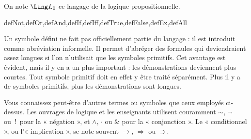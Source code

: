 \documentclass[11pt,a4paper,openany]{memoir}
\begin{document}
On note $\Lang L_0$ ce langage de la logique propositionnelle.


\begin{tagblock}{defNot,defOr,defAnd,defIf,defIff,defTrue,defFalse,defEx,defAll}
\begin{explain}
Un symbole défini ne fait pas officiellement partie du langage :
il est introduit comme abréviation informelle. Il permet d'abréger
des formules qui deviendraient assez longues si l'on n'utilisait que
les symboles primitifs. Cet avantage est évident, mais il y en a un
plus important : les démonstrations deviennent plus courtes. Tout
symbole primitif doit en effet y être traité séparément. Plus il y a
de symboles primitifs, plus les démonstrations sont longues.
\end{explain}
\end{tagblock}


\begin{intro}
Vous connaissez peut-être d'autres termes ou symboles que ceux
employés ci-dessus. Les ouvrages de logique et les enseignants
utilisent couramment $\sim$, $\neg$ ou~!\ pour la « négation »,
et $\wedge$, $\cdot$ ou $\&$ pour la « conjonction ».
Le « conditionnel », ou l'« implication », se note souvent
$\rightarrow$, $\Rightarrow$ ou $\supset$.
\end{intro}
\end{document}
